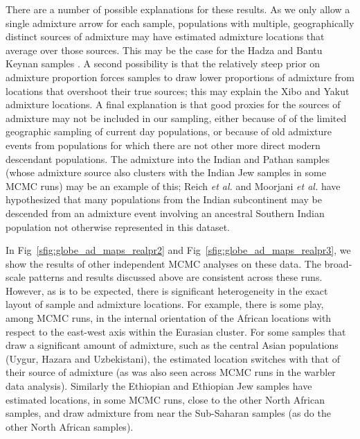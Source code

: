 \documentclass[10pt,letterpaper]{article}
\begin{document}
There are a number of possible explanations for these results. As we only allow a single admixture arrow for each sample, populations with multiple, geographically distinct sources of admixture may have estimated admixture locations that average over those sources. This may be the case for the Hadza and Bantu Keynan samples \cite{Hellenthal}.  A second possibility is that the relatively steep prior on admixture proportion forces samples to draw lower proportions of admixture from locations that overshoot their true sources; this may explain the Xibo and Yakut admixture locations. A final explanation is that good proxies for the sources of admixture may not be included in our sampling, either because of of the limited geographic sampling of current day populations, or because of old admixture events from populations for which there are not other more direct modern descendant populations. The admixture into the Indian and Pathan samples (whose admixture source also clusters with the Indian Jew samples in some MCMC runs) may be an example of this; Reich \emph{et al.} \cite{reich_india_2009} and Moorjani \emph{et al.} \cite{moorjani_india_2013} have hypothesized that many populations from the Indian subcontinent may be descended from an admixture event involving an ancestral Southern Indian population not otherwise represented in this dataset.

In Fig\ \ref{sfig:globe_ad_maps_realpr2} and Fig\ \ref{sfig:globe_ad_maps_realpr3}, we show the results of other independent MCMC analyses on these data. The broad-scale patterns and results discussed above are consistent across these runs. However, as is to be expected, there is significant heterogeneity in the exact layout of sample and admixture locations. For example, there is some play, among MCMC runs, in the internal orientation of the African locations with respect to the east-west axis within the Eurasian cluster.  For some samples that draw a significant amount of admixture, such as the central Asian populations (Uygur, Hazara and Uzbekistani), the estimated location switches with that of their source of admixture (as was also seen across MCMC runs in the warbler data analysis). Similarly the Ethiopian and Ethiopian Jew samples have estimated locations, in some MCMC runs, close to the other North African samples, and draw admixture from near the Sub-Saharan samples (as do the other North African samples).
\end{document}
